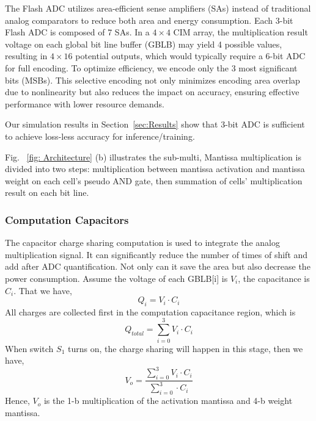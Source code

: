 The Flash ADC utilizes area-efficient sense amplifiers (SAs) instead of traditional analog comparators to reduce both area and energy consumption. Each 3-bit Flash ADC is composed of 7 SAs.
In a $4\times4$ CIM array, the multiplication result voltage on each global bit line buffer (GBLB) may yield 4 possible values, resulting in $4\times16$ potential outputs, which would typically require a 6-bit ADC for full encoding.
To optimize efficiency, we encode only the 3 most significant bits (MSBs). 
This selective encoding not only minimizes encoding area overlap due to nonlinearity but also reduces the impact on accuracy, ensuring effective performance with lower resource demands.
{Our simulation results in Section~\ref{sec:Results} show that 3-bit ADC is sufficient to achieve loss-less accuracy for inference/training.











\iffalse

Fig.  \textcolor{blue}{~\ref{fig: Architecture}} (b) illustrates the sub-multi, Mantissa multiplication is divided into two steps: multiplication between mantissa activation and mantissa weight on each cell's pseudo AND gate,  then summation of cells' multiplication result on each bit line. 

\subsubsection{Computation Capacitors}
The capacitor charge sharing computation is used to integrate the analog multiplication signal. It can significantly reduce the number of times of shift and add after ADC quantification. Not only can it save the area but also decrease the power consumption.  Assume the voltage of each GBLB[i] is $V_i$, the capacitance is $C_i$. That we have,
\begin{equation}
Q_i= V_i \cdot C_i
\end{equation}
All charges are collected first in the computation capacitance region, which is
\begin{equation}
Q_{total} =\sum_{i=0}^{3} V_i \cdot C_i
\end{equation}
When switch $S_1$ turns on, the charge sharing will happen in this stage, then we have,
\begin{equation}
V_{o} =\frac{\sum_{i=0}^{3} V_i \cdot C_i}{\sum_{i=0}^{3} \cdot C_i}
\end{equation}
Hence, $V_o$  is the 1-b multiplication of the activation mantissa and 4-b weight mantissa. 



}

